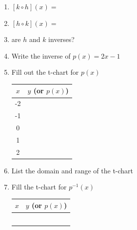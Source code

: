 \documentclass[12pt]{article}
\begin{document}
\begin{enumerate}[resume]
	\setlength\itemsep{1cm}
	
	\item $[k\circ h](x)=$\\
	
	\item $[h \circ k](x)=$\\
	
	\item are $h$ and $k$ inverses?\\
	
	\item Write the inverse of $p(x)=2x-1$\\
	
		\vspace{1in}
		
	\item Fill out the t-chart for $p(x)$
	
	\begin{center}
	\begin{tabular}{c | c}
	
		\hspace{.5cm}$x$ \hspace{.5cm} & $y$ (or $p(x)$) \\ \hline
	
		-2 & \\
		 
		-1 & \\
		
		0 &  \\
		
		1 &  \\
		
		2 &  \\
	
	\end{tabular}
	\end{center}
	
	\item List the domain and range of the t-chart\\
	
	\item Fill the t-chart for $p^{-1}(x)$\\
		\begin{center}
		\begin{tabular}{c | c}
	
		\hspace{.5cm}$x$ \hspace{.5cm} & $y$ (or $p(x)$) \\ \hline
	
		& \\
		 
		& \\
		
		&  \\
		
		&  \\
		
		&  \\
	
	\end{tabular}
	\end{center}	
\end{enumerate}
\end{document}

